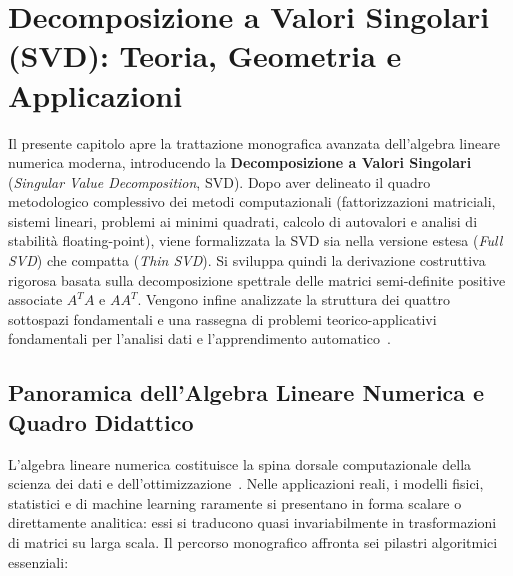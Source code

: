 \chapter[Decomposizione a Valori Singolari (SVD)]{Decomposizione a Valori Singolari (SVD): Teoria, Geometria e Applicazioni}
\label{chap:decomposizione-valori-singolari-svd}

Il presente capitolo apre la trattazione monografica avanzata dell'algebra lineare numerica moderna, introducendo la \textbf{Decomposizione a Valori Singolari} (\textit{Singular Value Decomposition}, SVD). Dopo aver delineato il quadro metodologico complessivo dei metodi computazionali (fattorizzazioni matriciali, sistemi lineari, problemi ai minimi quadrati, calcolo di autovalori e analisi di stabilit\`a floating-point), viene formalizzata la SVD sia nella versione estesa (\textit{Full SVD}) che compatta (\textit{Thin SVD}). Si sviluppa quindi la derivazione costruttiva rigorosa basata sulla decomposizione spettrale delle matrici semi-definite positive associate $A^T A$ e $A A^T$. Vengono infine analizzate la struttura dei quattro sottospazi fondamentali e una rassegna di problemi teorico-applicativi fondamentali per l'analisi dati e l'apprendimento automatico~\cite{golub2013matrix,trefethen1997numerical,strang2019linear}.

\FloatBarrier
\section{Panoramica dell'Algebra Lineare Numerica e Quadro Didattico}
\label{sec:svd-panoramica-didattica}

L'algebra lineare numerica costituisce la spina dorsale computazionale della scienza dei dati e dell'ottimizzazione~\cite{demmel1997applied,trefethen1997numerical}. Nelle applicazioni reali, i modelli fisici, statistici e di machine learning raramente si presentano in forma scalare o direttamente analitica: essi si traducono quasi invariabilmente in trasformazioni di matrici su larga scala. Il percorso monografico affronta sei pilastri algoritmici essenziali:

